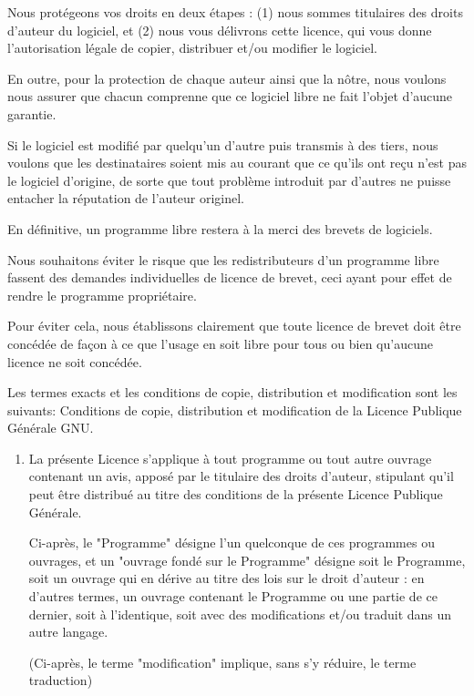 {Nous protégeons vos droits en deux étapes : (1) nous sommes titulaires des droits d'auteur du logiciel, et (2) nous vous délivrons cette licence, qui vous donne l'autorisation légale de copier, distribuer et/ou modifier le logiciel.

En outre, pour la protection de chaque auteur ainsi que la nôtre, nous voulons nous assurer que chacun comprenne que ce logiciel libre ne fait l'objet d'aucune garantie.

Si le logiciel est modifié par quelqu'un d'autre puis transmis à des tiers, nous voulons que les destinataires soient mis au courant que ce qu'ils ont reçu n'est pas le logiciel d'origine, de sorte que tout problème introduit par d'autres ne puisse entacher la réputation de l'auteur originel.

En définitive, un programme libre restera à la merci des brevets de logiciels.

Nous souhaitons éviter le risque que les redistributeurs d'un programme libre fassent des demandes individuelles de licence de brevet, ceci ayant pour effet de rendre le programme propriétaire.

Pour éviter cela, nous établissons clairement que toute licence de brevet doit être concédée de façon à ce que l'usage en soit libre pour tous ou bien qu'aucune licence ne soit concédée.

Les termes exacts et les conditions de copie, distribution et modification sont les suivants:
Conditions de copie, distribution et modification de la Licence Publique Générale GNU.

	\begin{enumerate}

\item La présente Licence s'applique à tout programme ou tout autre ouvrage contenant un avis, apposé par le titulaire des droits d'auteur, stipulant qu'il peut être distribué au titre des conditions de la présente Licence Publique Générale.

Ci-après, le "Programme" désigne l'un quelconque de ces programmes ou ouvrages, et un "ouvrage fondé sur le Programme" désigne soit le Programme, soit un ouvrage qui en dérive au titre des lois sur le droit d'auteur : en d'autres termes, un ouvrage contenant le Programme ou une partie de ce dernier, soit à l'identique, soit avec des modifications et/ou traduit dans un autre langage.

(Ci-après, le terme "modification" implique, sans s'y réduire, le terme traduction)


\end{enumerate}}

